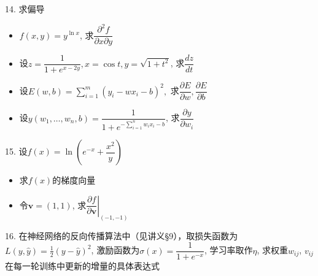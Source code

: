 \documentclass[10pt]{beamer}
\makeatletter
\newcommand\HUGE{\@setfontsize\Huge{35}{46}}
\makeatother
\begin{document}
\begin{frame}

14. 求偏导
\begin{itemize}
\item[(1)] $f(x,y)=y^{\ln x}$, 求$\dfrac{\partial^2 f}{\partial x \partial y}$
\item[(2)] 设$z = \dfrac{1}{1+e^{x-2y}}, x = \cos t, y = \sqrt{1+t^2}$, 求$\dfrac{dz}{dt}$
\item[(3)] 设$E(w,b) = \sum\limits_{i=1}^m (y_i-wx_i-b)^2,$ 求$\dfrac{\partial E}{\partial w}, \dfrac{\partial E}{\partial b}$
\item[(4)] 设$y(w_1,\ldots,w_n,b) = \dfrac{1}{1+e^{-\sum\limits_{i=1}^n w_ix_i - b}}$, 求$\dfrac{\partial y}{\partial w_i}$
\end{itemize}

\end{frame}


\begin{frame}

15. 设$f(x) = \ln \left(e^{-x} + \dfrac{x^2}{y} \right)$
\begin{itemize}
\item[(1)] 求$f(x)$的梯度向量
\item[(2)] 令$\mathbf{v} = (1,1)$, 求$\left. \dfrac{\partial f}{\partial \mathbf{v}} \right|_{(-1,-1)}$
\end{itemize}

\vspace{1em}

16. 在神经网络的反向传播算法中（见讲义\S 9），取损失函数为$L(y,\widehat{y}) = \frac{1}{2}(y-\widehat{y})^2$, 激励函数为$\sigma(x) = \dfrac{1}{1+e^{-x}}$, 学习率取作$\eta$, 求权重$w_{ij}$, $v_{ij}$在每一轮训练中更新的增量的具体表达式

\end{frame}






\end{document}
